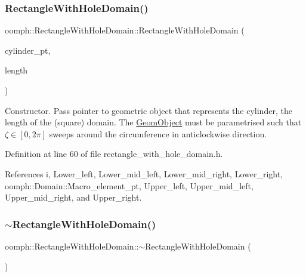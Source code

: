 \subsubsection{\texorpdfstring{Rectangle\+With\+Hole\+Domain()}{RectangleWithHoleDomain()}}
{\footnotesize\ttfamily oomph\+::\+Rectangle\+With\+Hole\+Domain\+::\+Rectangle\+With\+Hole\+Domain (\begin{DoxyParamCaption}\item[{\hyperlink{classoomph_1_1GeomObject}{Geom\+Object} $\ast$}]{cylinder\+\_\+pt,  }\item[{const double \&}]{length }\end{DoxyParamCaption})\hspace{0.3cm}{\ttfamily [inline]}}



Constructor. Pass pointer to geometric object that represents the cylinder, the length of the (square) domain. The \hyperlink{classoomph_1_1GeomObject}{Geom\+Object} must be parametrised such that $\zeta \in [0,2\pi]$ sweeps around the circumference in anticlockwise direction. 



Definition at line 60 of file rectangle\+\_\+with\+\_\+hole\+\_\+domain.\+h.



References i, Lower\+\_\+left, Lower\+\_\+mid\+\_\+left, Lower\+\_\+mid\+\_\+right, Lower\+\_\+right, oomph\+::\+Domain\+::\+Macro\+\_\+element\+\_\+pt, Upper\+\_\+left, Upper\+\_\+mid\+\_\+left, Upper\+\_\+mid\+\_\+right, and Upper\+\_\+right.

\mbox{\label{classoomph_1_1RectangleWithHoleDomain_adae7fabe3167ec35c1c0d4af813a4dca}} 
\subsubsection{\texorpdfstring{$\sim$\+Rectangle\+With\+Hole\+Domain()}{~RectangleWithHoleDomain()}}
{\footnotesize\ttfamily oomph\+::\+Rectangle\+With\+Hole\+Domain\+::$\sim$\+Rectangle\+With\+Hole\+Domain (\begin{DoxyParamCaption}{ }\end{DoxyParamCaption})\hspace{0.3cm}{\ttfamily [inline]}}



